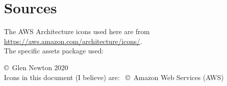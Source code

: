 \documentclass[12pt]{article}
\begin{document}
\section{Sources}
The AWS Architecture icons used here are from \url{https://aws.amazon.com/architecture/icons/}.\\
The specific assets package used: \href{https://d1.awsstatic.com/webteam/architecture-icons/Q32020/\assetZipFile}{\assetZipFileSplit}

\vspace{3cm}
\noindent \copyright\ Glen Newton 2020\\
Icons in this document (I believe) are: \ \copyright\ Amazon Web Services (AWS)
\vspace{5mm}

\setlength{\parindent}{0pt}




\normalsize

\appendix
\end{document}
